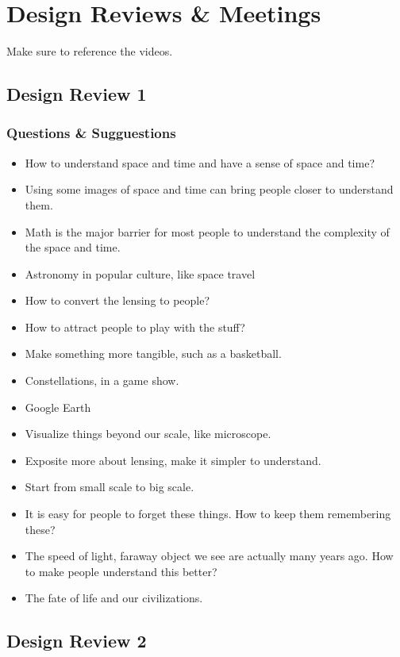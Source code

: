 \chapter{Design Reviews \& Meetings}
Make sure to reference the videos.

\section{Design Review 1}

\subsection{Questions \& Sugguestions}
\begin{itemize}
\item How to understand space and time and have a sense of space and time?
\item Using some images of space and time can bring people closer to understand them.
\item Math is the major barrier for most people to understand the complexity of the space and time.
\item Astronomy in popular culture, like space travel
\item How to convert the lensing to people?
\item How to attract people to play with the stuff?
\item Make something more tangible, such as a basketball.
\item Constellations, in a game show.
\item Google Earth
\item Visualize things beyond our scale, like microscope.
\item Exposite more about lensing, make it simpler to understand.
\item Start from small scale to big scale.
\item It is easy for people to forget these things. How to keep them remembering these?
\item The speed of light, faraway object we see are actually many years ago. How to make people understand this better?
\item The fate of life and our civilizations.
\end{itemize}

\section{Design Review 2}


